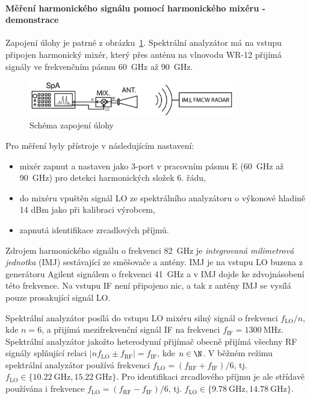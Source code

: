 \documentclass[11pt,a4paper]{article}
\newcommand{\MHz}{\mathrm{MHz}}
\newcommand{\GHz}{\mathrm{GHz}}
\begin{document}
\paragraph*{Měření harmonického signálu pomocí harmonického mixéru - demonstrace} Zapojení úlohy je patrné z obrázku~\ref{fig:task3-zapojeni}. Spektrální analyzátor má na vstupu připojen harmonický mixér, který přes anténu na vlnovodu WR-12 přijímá signály ve frekvenčním pásmu 60~GHz až 90~GHz.
\begin{figure}[!ht]
    \centering
    \includegraphics[width=0.8\textwidth]{src/task3-zapojeni.png}
    \caption{\label{fig:task3-zapojeni}Schéma zapojení úlohy}
\end{figure}
Pro měření byly přístroje v následujícím nastavení:
\begin{itemize}
    \item mixér zapnut a nastaven jako 3-port v pracovním pásmu E (60~GHz až 90~GHz) pro detekci harmonických složek 6. řádu,
    \item do mixéru vpuštěn signál LO ze spektrálního analyzátoru o výkonové hladině 14 dBm jako při kalibraci výrobcem,
    \item zapnutá identifikace zrcadlových příjmů.
\end{itemize}
Zdrojem harmonického signálu o frekvenci 82~GHz je \emph{integrovaná milimetrová jednotka} (IMJ) sestávající ze směšovače a antény. IMJ je na vstupu LO buzena z generátoru Agilent signálem o frekvenci 41~GHz a v IMJ dojde ke zdvojnásobení této frekvence. Na vstupu IF není připojeno nic, a tak z antény IMJ se vysílá pouze prosakující signál LO.

Spektrální analyzátor posílá do vstupu LO mixéru silný signál o frekvenci $f_{\mathrm{LO}}/n$, kde $n=6$, a přijímá mezifrekvenční signál IF na frekvenci $f_{\mathrm{IF}} = 1300\ \MHz$. Spektrální analyzátor jakožto heterodynní přijímač obecně přijímá všechny RF signály splňující relaci $|nf_{\mathrm{LO}}\pm f_{\mathrm{RF}}| = f_{\mathrm{IF}}$, kde $n \in \N$. V běžném režimu spektrální analyzátor používá frekvenci $f_{\mathrm{LO}} = (f_{\mathrm{RF}}+f_{\mathrm{IF}})/6$, tj. $f_{\mathrm{LO}} \in \{10.22\ \GHz,15.22\ \GHz\}$. Pro identifikaci zrcadlového příjmu je ale střídavě používána i frekvence $f_{\mathrm{LO}} = (f_{\mathrm{RF}} - f_{\mathrm{IF}})/6$, tj. $f_{\mathrm{LO}} \in \{9.78\ \GHz, 14.78\ \GHz\}$.
\end{document}
